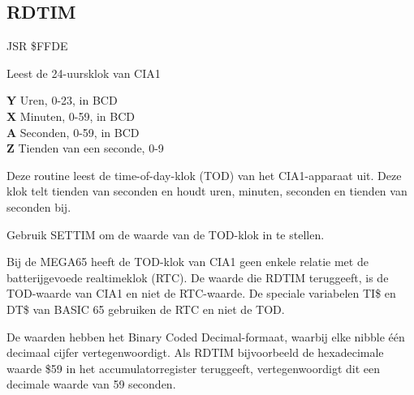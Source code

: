 
\newpage
\subsection{RDTIM}
\label{KERNAL Jump Table!RDTIM}
\begin{description}[leftmargin=2cm,style=nextline]
    \item [Adres:] JSR \$FFDE    \item [Omschrijving:] Leest de 24-uursklok van CIA1    \item [Uitvoer:]        \textbf{Y} Uren, 0-23, in BCD \\        \textbf{X} Minuten, 0-59, in BCD \\        \textbf{A} Seconden, 0-59, in BCD \\        \textbf{Z} Tienden van een seconde, 0-9    \item [Opmerkingen:]        Deze routine leest de time-of-day-klok (TOD) van het CIA1-apparaat uit. Deze klok telt tienden van seconden en houdt uren, minuten, seconden en tienden van seconden bij.

        Gebruik SETTIM om de waarde van de TOD-klok in te stellen.

        Bij de MEGA65 heeft de TOD-klok van CIA1 geen enkele relatie met de batterijgevoede realtimeklok (RTC). De waarde die RDTIM teruggeeft, is de TOD-waarde van CIA1 en niet de RTC-waarde. De speciale variabelen TI\$ en DT\$ van BASIC 65 gebruiken de RTC en niet de TOD.

        De waarden hebben het Binary Coded Decimal-formaat, waarbij elke nibble één decimaal cijfer vertegenwoordigt. Als RDTIM bijvoorbeeld de hexadecimale waarde \$59 in het accumulatorregister teruggeeft, vertegenwoordigt dit een decimale waarde van 59 seconden.    \item [Voorbeeld:]
\end{description}



